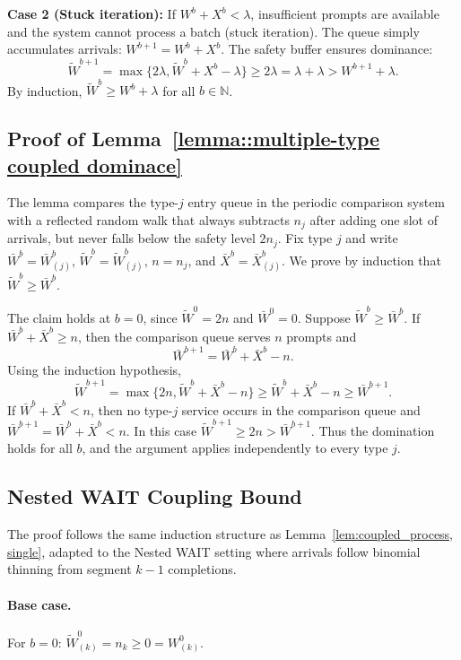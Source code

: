 \textbf{Case 2 (Stuck iteration):} If $W^b + X^b < \lambda$, insufficient prompts are available and the system cannot process a batch (stuck iteration). The queue simply accumulates arrivals: $W^{b+1} = W^b + X^b$. The safety buffer ensures dominance:
$$\tilde{W}^{b+1}=\max\{ 2\lambda, \tilde{W}^b + X^b - \lambda \}\geq 2\lambda = \lambda+\lambda>W^{b+1}+\lambda.$$
By induction, $\tilde{W}^b \geq W^b + \lambda$ for all $b \in \mathbb{N}$.

\subsection{Proof of Lemma~\ref{lemma::multiple-type coupled dominace}}\label{appendix_lemma::proof of multiple-type coupled dominace}
The lemma compares the type-\(j\) entry queue in the periodic comparison system with a reflected random walk that always subtracts \(n_j\) after adding one slot of arrivals, but never falls below the safety level \(2n_j\). Fix type \(j\) and write \(\bar W^b=\bar W^b_{(j)}\), \(\widetilde W^b=\widetilde W^b_{(j)}\), \(n=n_j\), and \(\bar X^b=\bar X^b_{(j)}\). We prove by induction that \(\widetilde W^b\ge \bar W^b\).

The claim holds at \(b=0\), since \(\widetilde W^0=2n\) and \(\bar W^0=0\). Suppose \(\widetilde W^b\ge \bar W^b\). If \(\bar W^b+\bar X^b\ge n\), then the comparison queue serves \(n\) prompts and
\[
    \bar W^{b+1}=\bar W^b+\bar X^b-n.
\]
Using the induction hypothesis,
\[
    \widetilde W^{b+1}
    =\max\{2n,\widetilde W^b+\bar X^b-n\}
    \ge \widetilde W^b+\bar X^b-n
    \ge \bar W^{b+1}.
\]
If \(\bar W^b+\bar X^b<n\), then no type-\(j\) service occurs in the comparison queue and \(\bar W^{b+1}=\bar W^b+\bar X^b<n\). In this case \(\widetilde W^{b+1}\ge2n>\bar W^{b+1}\). Thus the domination holds for all \(b\), and the argument applies independently to every type \(j\).

\subsection{Nested WAIT Coupling Bound}\label{appendix_lemma::proof of nested coupled process}
The proof follows the same induction structure as Lemma~\ref{lem:coupled_process, single}, adapted to the Nested WAIT setting where arrivals follow binomial thinning from segment $k-1$ completions.

\paragraph{Base case.} For $b = 0$: $\tilde{W}_{(k)}^0 = n_{k}\geq 0=W_{(k)}^0$.

